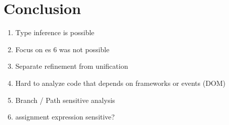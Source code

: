 \section{Conclusion}

\begin{enumerate}
	\item Type inference is possible
	\item Focus on es 6 was not possible
	\item Separate refinement from unification
	\item Hard to analyze code that depends on frameworks or events (DOM)
	\item Branch / Path sensitive analysis
	\item assignment expression sensitive?
\end{enumerate}